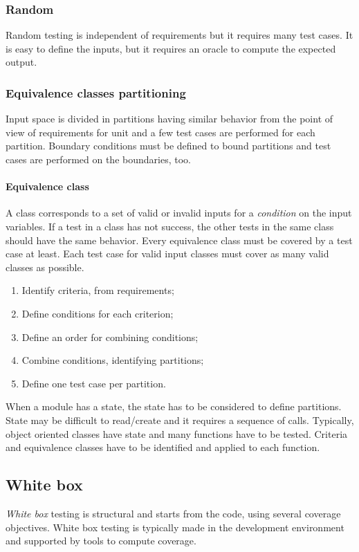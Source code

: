 \subsubsection{Random}
Random testing is independent of requirements but it requires many test cases. It is easy to define the inputs, but it requires an oracle to compute the expected output.

\subsubsection{Equivalence classes partitioning}
Input space is divided in partitions having similar behavior from the point of view of requirements for unit and a few test cases are performed for each partition. Boundary conditions must be defined to bound partitions and test cases are performed on the boundaries, too.

\paragraph{Equivalence class} A class corresponds to a set of valid or invalid inputs for a \emph{condition} on the input variables. If a test in a class has not success, the other tests in the same class should have the same behavior. Every equivalence class must be covered by a test case at least. Each test case for valid input classes must cover as many valid classes as possible.

\begin{enumerate}
\item Identify criteria, from requirements;
\item Define conditions for each criterion;
\item Define an order for combining conditions;
\item Combine conditions, identifying partitions;
\item Define one test case per partition.
\end{enumerate}

When a module has a state, the state has to be considered to define partitions. State may be difficult to read/create and it requires a sequence of calls. Typically, object oriented classes have state and many functions have to be tested. Criteria and equivalence classes have to be identified and applied to each function.

\subsection{White box}
\emph{White box} testing is structural and starts from the code, using several coverage objectives. White box testing is typically made in the development environment and supported by tools to compute coverage.

